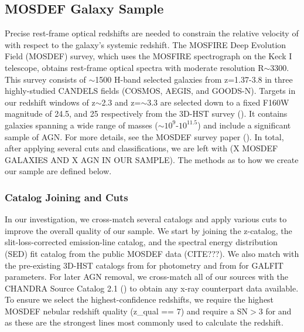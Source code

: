 \documentclass[linenumbers,amsmath,trackchanges,preprint2]{aastex702}
\begin{document}
\subsection{MOSDEF Galaxy Sample}
\par Precise rest-frame optical redshifts are needed to constrain the relative velocity of \lya with respect to the galaxy's systemic redshift. The MOSFIRE Deep Evolution Field (MOSDEF) survey, which uses the MOSFIRE spectrograph on the Keck I telescope, obtains rest-frame optical spectra with moderate resolution R$\sim$3300. This survey consists of $\sim$1500 H-band selected galaxies from z=1.37-3.8 in three highly-studied CANDELS fields (COSMOS, AEGIS, and GOODS-N). Targets in our redshift windows of z$\sim$2.3 and z=$\sim$3.3 are selected down to a fixed F160W magnitude of 24.5, and 25 respectively from the 3D-HST survey (\cite{skelton2014}). It contains galaxies spanning a wide range of masses ($\sim$$10^9$-$10^{11.5}$\Msun) and include a significant sample of AGN. For more details, see the MOSDEF survey paper (\cite{kriek2015}). In total, after applying several cuts and classifications, we are left with (X MOSDEF GALAXIES AND X AGN IN OUR SAMPLE). The methods as to how we create our sample are defined below.
\subsubsection{Catalog Joining and Cuts}
\par In our investigation, we cross-match several catalogs and apply various cuts to improve the overall quality of our sample. We start by joining the z-catalog, the slit-loss-corrected emission-line catalog, and the spectral energy distribution (SED) fit catalog from the public MOSDEF data (CITE???). We also match with the pre-existing 3D-HST catalogs from \cite{skelton2014} for photometry and from \cite{vanderWel2014} for GALFIT parameters. For later AGN removal, we cross-match all of our sources with the CHANDRA Source Catalog 2.1 (\cite{?}) to obtain any x-ray counterpart data available. To ensure we select the highest-confidence redshifts, we require the highest MOSDEF nebular redshift quality (z\_qual == 7) and require a SN$>3$ for \Ha and \OIII as these are the strongest lines most commonly used to calculate the redshift.
\end{document}
